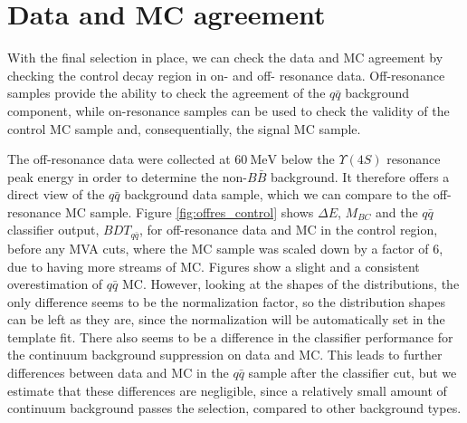 \documentclass[headings=standardclasses,headings=big,oneside,a4paper,openany,12pt]{scrbook}
\newcommand {\e}[1]{\mathrm{~#1}}
\begin{document}
\section{Data and MC agreement}

With the final selection in place, we can check the data and MC agreement by checking the control decay region in on- and off- resonance data. Off-resonance samples provide the ability to check the agreement of the $q\bar q$ background component, while on-resonance samples can be used to check the validity of the control MC sample and, consequentially, the signal MC sample.

The off-resonance data were collected at $60\e{MeV}$ below the $\Upsilon(4S)$ resonance peak energy in order to determine the non-$B\bar B$ background. It therefore offers a direct view of the $q\bar q$ background data sample, which we can compare to the off-resonance MC sample. Figure \ref{fig:offres_control} shows $\Delta E$, $M_{BC}$ and the $q \bar q$ classifier output, $BDT_{q\bar q}$, for off-resonance data and MC in the control region, before any MVA cuts, where the MC sample was scaled down by a factor of $6$, due to having more streams of MC. Figures show a slight and a consistent overestimation of $q\bar q$ MC. However, looking at the shapes of the distributions, the only difference seems to be the normalization factor, so the distribution shapes can be left as they are, since the normalization will be automatically set in the template fit. There also seems to be a difference in the classifier performance for the continuum background suppression on data and MC. This leads to further differences between data and MC in the $q \bar q$ sample after the classifier cut, but we estimate that these differences are negligible, since a relatively small amount of continuum background passes the selection, compared to other background types.
\end{document}
